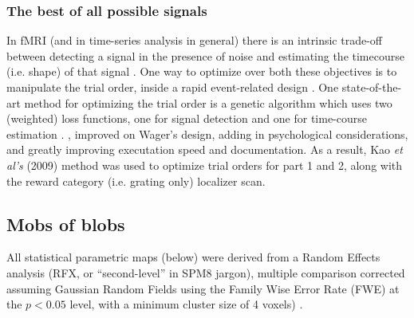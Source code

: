 \documentclass[doc,12pt]{apa}        %
\begin{document}
\subsubsection{The best of all possible signals}
\label{subsub:bestsignal}
In fMRI (and in time-series analysis in general) there is an intrinsic trade-off between detecting a signal in the presence of noise and estimating the timecourse (i.e. shape) of that signal \cite{Dale:1999p7901,Birn:2002p1777,Liu:2004p2141}.   One way to optimize over both these objectives is to manipulate the trial order, inside a rapid event-related design \cite{Miezin:2000p7924}.  One state-of-the-art method for optimizing the trial order is a genetic algorithm which uses two (weighted) loss functions, one for signal detection and one for time-course estimation \cite{Wager:2003p2980}. , improved on Wager's design, adding in psychological considerations, and greatly improving executation speed and documentation.  As a result, Kao \emph{et al's} (2009) method was used to optimize trial orders for part 1 and 2, along with the reward category (i.e. grating only) localizer scan.

\subsection{Mobs of blobs}
\label{sub:blob}
All statistical parametric maps (below) were derived from a Random Effects analysis (RFX, or ``second-level'' in SPM8 jargon), multiple comparison corrected assuming Gaussian Random Fields using the Family Wise Error Rate (FWE) at the $p < 0.05$ level, with a minimum cluster size of 4 voxels) \cite{Worsley:1996p9367}. 
\end{document}
